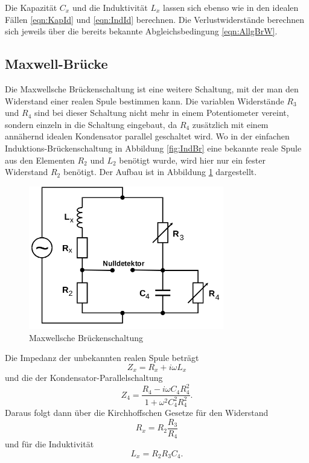 Die Kapazität $C_x$ und die Induktivität $L_x$ lassen sich ebenso wie
in den idealen Fällen \eqref{eqn:KapId} und \eqref{eqn:IndId} berechnen.
Die Verlustwiderstände berechnen sich jeweils über die bereits bekannte
Abgleichsbedingung \eqref{eqn:AllgBrW}.


\subsection{Maxwell-Brücke}

Die Maxwellsche Brückenschaltung ist eine weitere Schaltung, mit der man
den Widerstand einer realen Spule bestimmen kann.
Die variablen Widerstände $R_3$ und $R_4$ sind bei dieser Schaltung nicht mehr
in einem Potentiometer vereint, sondern einzeln in die Schaltung eingebaut,
da $R_4$ zusätzlich mit einem annähernd idealen Kondensator
parallel geschaltet wird.
Wo in der einfachen Induktions-Brückenschaltung in Abbildung \ref{fig:IndBr}
eine bekannte reale Spule aus den Elementen $R_2$ und $L_2$ benötigt wurde,
wird hier nur ein fester Widerstand $R_2$ benötigt. Der Aufbau ist in
Abbildung \ref{fig:MaxBr} dargestellt.

\begin{figure}[h]
  \centering
  \includegraphics[height=6.25cm]{MaxBr.png}
  \caption{Maxwellsche Brückenschaltung \cite{anleitung}}
  \label{fig:MaxBr}
\end{figure}

Die Impedanz der unbekannten realen Spule beträgt
\begin{equation}
  Z_x = R_x + i\omega L_x
\end{equation}
und die der Kondensator-Parallelschaltung
\begin{equation}
  Z_4 = \frac{R_4 - i\omega C_4R_4^2}{1 + \omega^2 C_4^2R_4^2} .
\end{equation}
Daraus folgt dann über die Kirchhoffschen Gesetze für den Widerstand
\begin{equation}
  R_x = R_2 \frac{R_3}{R_4}
\end{equation}
und für die Induktivität
\begin{equation}
  L_x = R_2 R_3 C_4 .
\end{equation}


